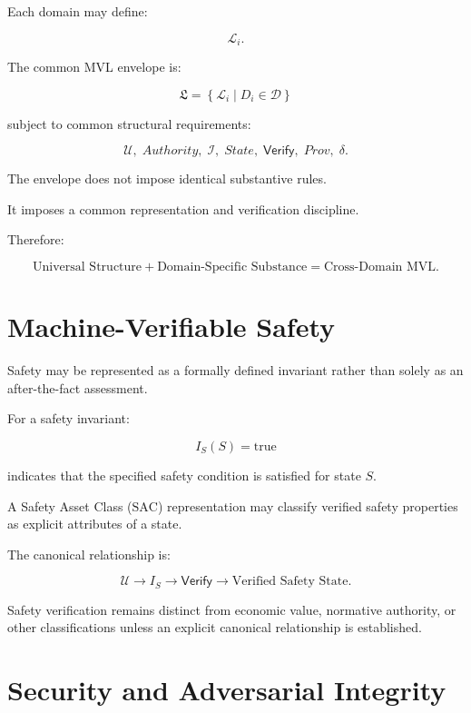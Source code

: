 \documentclass[11pt]{article}
\newcommand{\SAC}{\ensuremath{\mathrm{SAC}}}
\newcommand{\Purpose}{\mathcal{U}}
\newcommand{\Inv}{\mathcal{I}}
\newcommand{\Law}{\mathcal{L}}
\newcommand{\Verify}{\mathsf{Verify}}
\newcommand{\Domain}{\mathcal{D}}
\begin{document}
Each domain may define:

\[
\Law_i.
\]

The common MVL envelope is:

\[
\boxed{
\mathfrak{L}
=
\left\{
\Law_i
\mid
D_i\in\Domain
\right\}
}
\]

subject to common structural requirements:

\[
\Purpose,\;
Authority,\;
\Inv,\;
State,\;
\Verify,\;
Prov,\;
\delta.
\]

The envelope does not impose identical substantive rules.

It imposes a common representation and verification discipline.

Therefore:

\[
\boxed{
\text{Universal Structure}
+
\text{Domain-Specific Substance}
=
\text{Cross-Domain MVL}.
}
\]

\section{Machine-Verifiable Safety}

Safety may be represented as a formally defined invariant rather
than solely as an after-the-fact assessment.

For a safety invariant:

\[
I_S(S)=\mathrm{true}
\]

indicates that the specified safety condition is satisfied for
state $S$.

A Safety Asset Class (\SAC{}) representation may classify
verified safety properties as explicit attributes of a state.

The canonical relationship is:

\[
\boxed{
\Purpose
\rightarrow
I_S
\rightarrow
\Verify
\rightarrow
\text{Verified Safety State}.
}
\]

Safety verification remains distinct from economic value,
normative authority, or other classifications unless an explicit
canonical relationship is established.

\section{Security and Adversarial Integrity}
\end{document}
